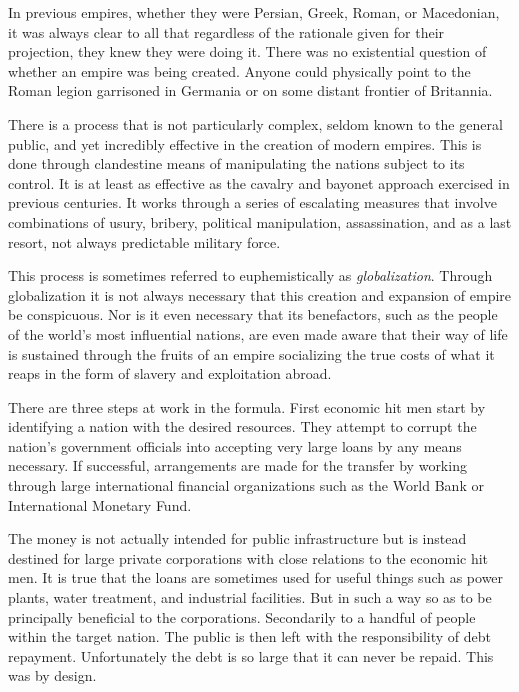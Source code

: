 In previous empires, whether they were Persian, Greek, Roman, or Macedonian, it was always clear to all that regardless of the rationale given for their projection, they knew they were doing it. There was no existential question of whether an empire was being created. Anyone could physically point to the Roman legion garrisoned in Germania or on some distant frontier of Britannia.

There is a process that is not particularly complex, seldom known to the general public, and yet incredibly effective in the creation of modern empires. This is done through clandestine means of manipulating the nations subject to its control. It is at least as effective as the cavalry and bayonet approach exercised in previous centuries. It works through a series of escalating measures that involve combinations of usury, bribery, political manipulation, assassination, and as a last resort, not always predictable military force. 

This process is sometimes referred to euphemistically as {\it globalization}. Through globalization it is not always necessary that this creation and expansion of empire be conspicuous. Nor is it even necessary that its benefactors, such as the people of the world's most influential nations, are even made aware that their way of life is sustained through the fruits of an empire socializing the true costs of what it reaps in the form of slavery and exploitation abroad.

There are three steps at work in the formula. First economic hit men start by identifying a nation with the desired resources. They attempt to corrupt the nation's government officials into accepting very large loans by any means necessary. If successful, arrangements are made for the transfer by working through large international financial organizations such as the World Bank or International Monetary Fund.

The money is not actually intended for public infrastructure but is instead destined for large private corporations with close relations to the economic hit men. It is true that the loans are sometimes used for useful things such as power plants, water treatment, and industrial facilities. But in such a way so as to be principally beneficial to the corporations. Secondarily to a handful of people within the target nation. The public is then left with the responsibility of debt repayment. Unfortunately the debt is so large that it can never be repaid. This was by design.

